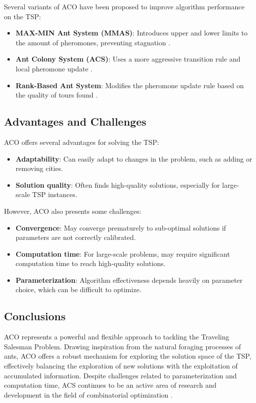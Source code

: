 Several variants of \Gls{ACO} have been proposed to improve algorithm performance on the \Gls{TSP}:

\begin{itemize}
	\item \textbf{MAX-MIN Ant System (\Gls{MMAS})}: Introduces upper and lower limits to the amount of pheromones, preventing stagnation \cite{stutzle2000max}.
	\item \textbf{Ant Colony System (\Gls{ACS})}: Uses a more aggressive transition rule and local pheromone update \cite{dorigo1997ant}.
	\item \textbf{Rank-Based Ant System}: Modifies the pheromone update rule based on the quality of tours found \cite{bullnheimer1999rank}.
\end{itemize}

\subsection{Advantages and Challenges}

ACO offers several advantages for solving the \Gls{TSP}:

\begin{itemize}
	\item \textbf{Adaptability}: Can easily adapt to changes in the problem, such as adding or removing cities.
	\item \textbf{Solution quality}: Often finds high-quality solutions, especially for large-scale \Gls{TSP} instances.
\end{itemize}

However, \Gls{ACO} also presents some challenges:

\begin{itemize}
	\item \textbf{Convergence}: May converge prematurely to sub-optimal solutions if parameters are not correctly calibrated.
	\item \textbf{Computation time}: For large-scale problems, may require significant computation time to reach high-quality solutions.
	\item \textbf{Parameterization}: Algorithm effectiveness depends heavily on parameter choice, which can be difficult to optimize.
\end{itemize}

\subsection{Conclusions}

\Gls{ACO} represents a powerful and flexible approach to tackling the Traveling Salesman Problem. Drawing inspiration from the natural foraging processes of ants, \Gls{ACO} offers a robust mechanism for exploring the solution space of the \Gls{TSP}, effectively balancing the exploration of new solutions with the exploitation of accumulated information. Despite challenges related to parameterization and computation time, \Gls{ACS} continues to be an active area of research and development in the field of combinatorial optimization \cite{dorigo2010ant}.
